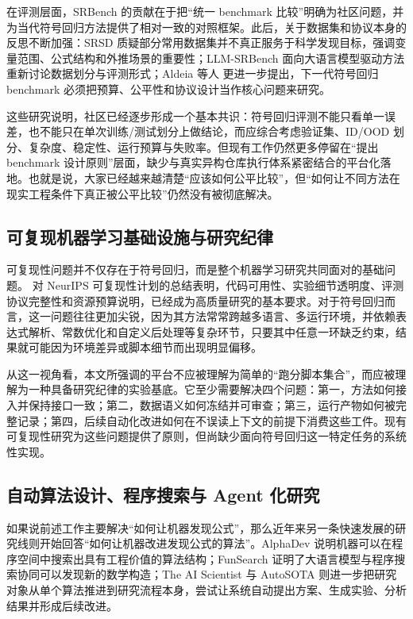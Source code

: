 \documentclass[UTF8,12pt]{ctexart}
\begin{document}
在评测层面，SRBench \citep{lacava2021srbench} 的贡献在于把“统一 benchmark 比较”明确为社区问题，并为当代符号回归方法提供了相对一致的对照框架。此后，关于数据集和协议本身的反思不断加强：SRSD \citep{matsubara2022rethinking} 质疑部分常用数据集并不真正服务于科学发现目标，强调变量范围、公式结构和外推场景的重要性；LLM-SRBench \citep{shojaee2025llmsrbench} 面向大语言模型驱动方法重新讨论数据划分与评测形式；Aldeia 等人 \citep{aldeia2025call} 更进一步提出，下一代符号回归 benchmark 必须把预算、公平性和协议设计当作核心问题来研究。

这些研究说明，社区已经逐步形成一个基本共识：符号回归评测不能只看单一误差，也不能只在单次训练/测试划分上做结论，而应综合考虑验证集、ID/OOD 划分、复杂度、稳定性、运行预算与失败率。但现有工作仍然更多停留在“提出 benchmark 设计原则”层面，缺少与真实异构仓库执行体系紧密结合的平台化落地。也就是说，大家已经越来越清楚“应该如何公平比较”，但“如何让不同方法在现实工程条件下真正被公平比较”仍然没有被彻底解决。

\subsection{可复现机器学习基础设施与研究纪律}

可复现性问题并不仅存在于符号回归，而是整个机器学习研究共同面对的基础问题。\citet{pineau2021improving} 对 NeurIPS 可复现性计划的总结表明，代码可用性、实验细节透明度、评测协议完整性和资源预算说明，已经成为高质量研究的基本要求。对于符号回归而言，这一问题往往更加尖锐，因为其方法常常跨越多语言、多运行环境，并依赖表达式解析、常数优化和自定义后处理等复杂环节，只要其中任意一环缺乏约束，结果就可能因为环境差异或脚本细节而出现明显偏移。

从这一视角看，本文所强调的平台不应被理解为简单的“跑分脚本集合”，而应被理解为一种具备研究纪律的实验基底。它至少需要解决四个问题：第一，方法如何接入并保持接口一致；第二，数据语义如何冻结并可审查；第三，运行产物如何被完整记录；第四，后续自动化改进如何在不误读上下文的前提下消费这些工件。现有可复现性研究为这些问题提供了原则，但尚缺少面向符号回归这一特定任务的系统性实现。

\subsection{自动算法设计、程序搜索与 Agent 化研究}

如果说前述工作主要解决“如何让机器发现公式”，那么近年来另一条快速发展的研究线则开始回答“如何让机器改进发现公式的算法”。AlphaDev \citep{mankowitz2023alphadev} 说明机器可以在程序空间中搜索出具有工程价值的算法结构；FunSearch \citep{romeraparedes2024funsearch} 证明了大语言模型与程序搜索协同可以发现新的数学构造；The AI Scientist 与 AutoSOTA \citep{lu2024aiscientist,li2026autosota} 则进一步把研究对象从单个算法推进到研究流程本身，尝试让系统自动提出方案、生成实验、分析结果并形成后续改进。
\end{document}
